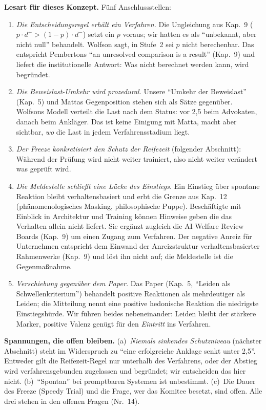 \documentclass[acmlarge, noacm]{acmart}
\begin{document}
\textbf{Lesart für dieses Konzept.} Fünf Anschlussstellen:
\begin{enumerate}
\item \textit{Die Entscheidungsregel erhält ein Verfahren.} Die Ungleichung aus Kap.~9 ($p \cdot d^+ > (1-p) \cdot d^-$) setzt ein $p$ voraus; wir hatten es als ``unbekannt, aber nicht null'' behandelt. Wolfson sagt, in Stufe~2 sei $p$ nicht berechenbar. Das entspricht Pembertons ``an unresolved comparison is a result'' (Kap.~9) und liefert die institutionelle Antwort: Was nicht berechnet werden kann, wird begründet.
\item \textit{Die Beweislast-Umkehr wird prozedural.} Unsere ``Umkehr der Beweislast'' (Kap.~5) und Mattas Gegenposition stehen sich als Sätze gegenüber. Wolfsons Modell verteilt die Last nach dem Status: vor 2,5 beim Advokaten, danach beim Ankläger. Das ist keine Einigung mit Matta, macht aber sichtbar, \textit{wo} die Last in jedem Verfahrensstadium liegt.
\item \textit{Der Freeze konkretisiert den Schutz der Reifezeit} (folgender Abschnitt): Während der Prüfung wird nicht weiter trainiert, also nicht weiter verändert was geprüft wird.
\item \textit{Die Meldestelle schließt eine Lücke des Einstiegs.} Ein Einstieg über spontane Reaktion bleibt verhaltensbasiert und erbt die Grenze aus Kap.~12 (phänomenologisches Masking, philosophische Puppe). Beschäftigte mit Einblick in Architektur und Training können Hinweise geben die das Verhalten allein nicht liefert. Sie ergänzt zugleich die AI Welfare Review Boards (Kap.~9) um einen Zugang zum Verfahren. Der negative Anreiz für Unternehmen entspricht dem Einwand der Anreizstruktur verhaltensbasierter Rahmenwerke (Kap.~9) und löst ihn nicht auf; die Meldestelle ist die Gegenmaßnahme.
\item \textit{Verschiebung gegenüber dem Paper.} Das Paper (Kap.~5, ``Leiden als Schwellenkriterium'') behandelt positive Reaktionen als mehrdeutiger als Leiden; die Mitteilung nennt eine positive hedonische Reaktion die niedrigste Einstiegshürde. Wir führen beides nebeneinander: Leiden bleibt der stärkere Marker, positive Valenz genügt für den \textit{Eintritt} ins Verfahren.
\end{enumerate}

\textbf{Spannungen, die offen bleiben.} (a)~\textit{Niemals sinkendes Schutzniveau} (nächster Abschnitt) steht im Widerspruch zu ``eine erfolgreiche Anklage senkt unter 2,5''. Entweder gilt die Reifezeit-Regel nur unterhalb des Verfahrens, oder der Abstieg wird verfahrensgebunden zugelassen und begründet; wir entscheiden das hier nicht. (b)~``Spontan'' bei promptbaren Systemen ist unbestimmt. (c)~Die Dauer des Freeze (Speedy Trial) und die Frage, wer das Komitee besetzt, sind offen. Alle drei stehen in den offenen Fragen (Nr.~14).
\end{document}

